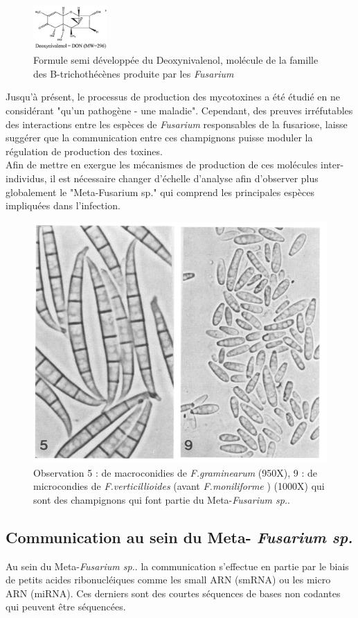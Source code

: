 \documentclass{report}
\begin{document}
\begin{figure}
    \centering
    \includegraphics[width=0.25\textwidth]{Images/fig_1.png}
    \caption{Formule semi développée du Deoxynivalenol, molécule de la famille des B-trichothécènes produite par les \textit{Fusarium}\cite{gaballah2023development}}
    \label{fig:mol}
\end{figure}

Jusqu’à présent, le processus de production des mycotoxines a été étudié en ne considérant "qu’un pathogène - une maladie". Cependant, des preuves irréfutables des interactions entre les espèces de \textit{Fusarium} responsables de la fusariose, laisse suggérer que la communication entre ces champignons puisse moduler la régulation de production des toxines.\\

Afin de mettre en exergue les mécanismes de production de ces molécules inter-individus, il est nécessaire changer d'échelle d'analyse afin d’observer plus globalement le "Meta-Fusarium sp." qui comprend les principales espèces impliquées dans l’infection.\cite{ponts2009fusarium, mycsa} \\

\begin{figure}
    \centering
    \includegraphics[width=.40\textwidth]{Images/fig_2.png}
    \caption{Observation 5 : de macroconidies de \textit{F.graminearum} (950X), 9 : de microcondies de \textit{F.verticillioides} (avant \textit{F.moniliforme} \cite{name}) (1000X) qui sont des champignons qui font partie du Meta-\textit{Fusarium sp.}.  \cite{taxonomy}}
    \label{fig:fusa}
\end{figure}

\subsection{Communication au sein du Meta-
\textit{Fusarium sp.}}
Au sein du Meta-\textit{Fusarium sp.}. la communication s’effectue en partie par le biais de petits acides ribonucléiques comme les small ARN (smRNA) ou les micro ARN (miRNA). Ces derniers sont des courtes séquences de bases non codantes qui peuvent être séquencées.\\
\end{document}
